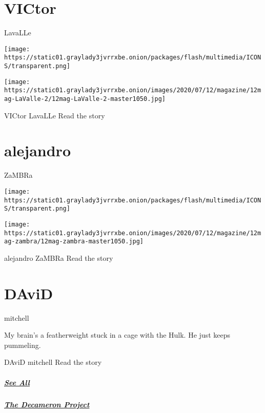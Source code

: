 \href{https://www.nytimes3xbfgragh.onion/interactive/2020/07/07/magazine/victor-lavalle-short-story.html}{}

\hypertarget{victor}{%
\section{VICtor}\label{victor}}

LavaLLe

\texttt{[image: https://static01.graylady3jvrrxbe.onion/packages/flash/multimedia/ICONS/transparent.png]}

\texttt{[image: https://static01.graylady3jvrrxbe.onion/images/2020/07/12/magazine/12mag-LaValle-2/12mag-LaValle-2-master1050.jpg]}

VICtor LavaLLe Read the story

\href{https://www.nytimes3xbfgragh.onion/interactive/2020/07/07/magazine/alejandro-zambra-short-story.html}{}

\hypertarget{alejandro}{%
\section{alejandro}\label{alejandro}}

ZaMBRa

\texttt{[image: https://static01.graylady3jvrrxbe.onion/packages/flash/multimedia/ICONS/transparent.png]}

\texttt{[image: https://static01.graylady3jvrrxbe.onion/images/2020/07/12/magazine/12mag-zambra/12mag-zambra-master1050.jpg]}

alejandro ZaMBRa Read the story

\href{https://www.nytimes3xbfgragh.onion/interactive/2020/07/07/magazine/david-mitchell-short-story.html}{}

\hypertarget{david}{%
\section{DAviD}\label{david}}

mitchell

My brain's a featherweight stuck in a cage with the Hulk. He just keeps
pummeling.

DAviD mitchell Read the story

\hypertarget{see-all}{%
\subparagraph{\texorpdfstring{\href{https://www.nytimes3xbfgragh.onion/interactive/2020/07/07/magazine/decameron-project-short-story-collection.html}{See
All}}{See All}}\label{see-all}}

\hypertarget{the-decameron-project-1}{%
\subparagraph{\texorpdfstring{\href{https://www.nytimes3xbfgragh.onion/interactive/2020/07/07/magazine/decameron-project-short-story-collection.html}{The
Decameron
Project}}{The Decameron Project}}\label{the-decameron-project-1}}

